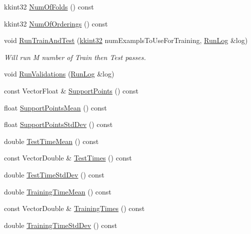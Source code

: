 \begin{DoxyCompactItemize}
\item 
kkint32 \hyperlink{class_k_k_m_l_l_1_1_cross_validation_mx_n_a186eec072dc967118743644b69ce14d0}{Num\+Of\+Folds} () const 
\item 
kkint32 \hyperlink{class_k_k_m_l_l_1_1_cross_validation_mx_n_a881b1a1982baf23b7e91ebeb21a63bff}{Num\+Of\+Orderings} () const 
\item 
void \hyperlink{class_k_k_m_l_l_1_1_cross_validation_mx_n_a1aeb1f25fc9c6646811925c3409e9cb2}{Run\+Train\+And\+Test} (\hyperlink{namespace_k_k_b_a8fa4952cc84fda1de4bec1fbdd8d5b1b}{kkint32} num\+Exampls\+To\+Use\+For\+Training, \hyperlink{class_k_k_b_1_1_run_log}{Run\+Log} \&log)
\begin{DoxyCompactList}\small\item\em Will run M number of Train then Test passes. \end{DoxyCompactList}\item 
void \hyperlink{class_k_k_m_l_l_1_1_cross_validation_mx_n_ae02968cea4b5c407a0ce06dd9b573012}{Run\+Validations} (\hyperlink{class_k_k_b_1_1_run_log}{Run\+Log} \&log)
\item 
const Vector\+Float \& \hyperlink{class_k_k_m_l_l_1_1_cross_validation_mx_n_ad8b9bf8e7a738590ed35841e0c06d390}{Support\+Points} () const 
\item 
float \hyperlink{class_k_k_m_l_l_1_1_cross_validation_mx_n_a1e1bcad4f4f9469e85d56151308d7d3c}{Support\+Points\+Mean} () const 
\item 
float \hyperlink{class_k_k_m_l_l_1_1_cross_validation_mx_n_a984b7201a5603f1a63013a2bda78f7fb}{Support\+Points\+Std\+Dev} () const 
\item 
double \hyperlink{class_k_k_m_l_l_1_1_cross_validation_mx_n_aa14f3d7d023eda7a20bee8eea163d9b2}{Test\+Time\+Mean} () const 
\item 
const Vector\+Double \& \hyperlink{class_k_k_m_l_l_1_1_cross_validation_mx_n_a2433c7849ef7efe48927a298a5198858}{Test\+Times} () const 
\item 
double \hyperlink{class_k_k_m_l_l_1_1_cross_validation_mx_n_a9c2c2def6553824886cdfd19f170ee98}{Test\+Time\+Std\+Dev} () const 
\item 
double \hyperlink{class_k_k_m_l_l_1_1_cross_validation_mx_n_a14c4b7779816eae03ffa61ff95859f3b}{Training\+Time\+Mean} () const 
\item 
const Vector\+Double \& \hyperlink{class_k_k_m_l_l_1_1_cross_validation_mx_n_a129bd5e7e2f3e0c480b7f98e61a988a9}{Training\+Times} () const 
\item 
double \hyperlink{class_k_k_m_l_l_1_1_cross_validation_mx_n_ab4dea2ab59a98fed508fa48a1bfbab58}{Training\+Time\+Std\+Dev} () const 
\end{DoxyCompactItemize}


